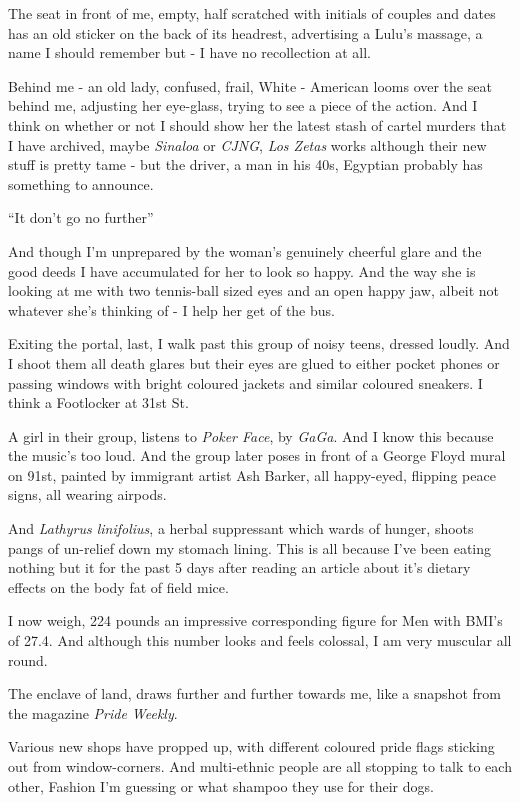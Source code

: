 \documentclass[19pt,openany]{book}
\begin{document}
The seat in front of me, empty,
half scratched with initials
of couples and dates
has an old sticker on the back
of its headrest, advertising a
Lulu's massage, a name I should remember
but - I have no recollection at all.

Behind me - an old lady,
confused, frail, White
- American looms over the seat
behind me,
adjusting her eye-glass, trying
to see a piece of the action.
And I think on whether
or not I should show her
the latest stash of cartel murders
that I have archived, maybe
\textit{Sinaloa} or \textit{CJNG},
\textit{Los Zetas} works
although their new stuff is pretty tame - but the driver,
a man in his 40s, Egyptian probably has something to announce.

``It don't go no further''

And though I'm unprepared
by the woman's genuinely
cheerful glare and the good deeds
I have accumulated for her
to look so happy. And the way
she is looking at me with two
tennis-ball sized eyes and
an open happy jaw, albeit not
whatever she's thinking of - I help
her get of the bus.

Exiting the portal, last,
I walk past this group of noisy
teens, dressed loudly. And I shoot
them all death glares
but their eyes are glued
to either pocket phones or passing
windows with bright coloured jackets
and similar coloured sneakers. I think a Footlocker
at 31st St.

A girl in their group,
listens to \textit{Poker Face},
by \textit{GaGa}.
And I know this because the
music's too loud. And the group
later poses in front of a George
Floyd mural on 91st, painted by immigrant artist
Ash Barker, all happy-eyed, flipping
peace signs, all wearing airpods.

And \textit{Lathyrus linifolius},
a herbal suppressant which wards of hunger, shoots pangs
of un-relief down my stomach lining. This is all because
I've been eating nothing but it for the past 5 days after
reading an article about it's dietary
effects on the body fat of field mice.

I now weigh, 224 pounds an impressive corresponding
figure for Men with BMI's of 27.4. And although
this number looks and feels colossal, I am very muscular
all round.

The enclave of land,
draws further and further towards me,
like a snapshot from the magazine \textit{Pride Weekly}.

Various new shops have propped up, with different
coloured pride flags sticking out from window-corners.
And multi-ethnic people are all stopping to talk to each
other, Fashion I'm guessing or what shampoo they use
for their dogs.
\end{document}
